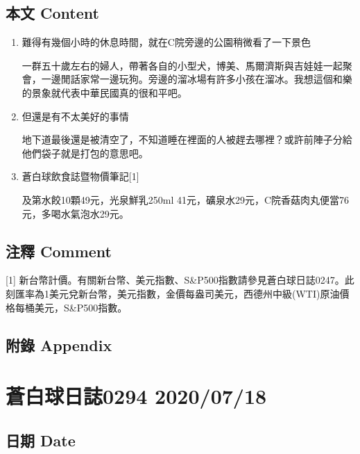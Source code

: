 \documentclass[
]{article}
\begin{document}
\hypertarget{ux672cux6587-content-16}{%
\subsection{本文 Content}\label{ux672cux6587-content-16}}

\begin{enumerate}
\def\labelenumi{\arabic{enumi}.}
\item
  難得有幾個小時的休息時間，就在C院旁邊的公園稍微看了一下景色

  一群五十歲左右的婦人，帶著各自的小型犬，博美、馬爾濟斯與吉娃娃一起聚會，一邊閒話家常一邊玩狗。旁邊的溜冰場有許多小孩在溜冰。我想這個和樂的景象就代表中華民國真的很和平吧。
\item
  但還是有不太美好的事情

  地下道最後還是被清空了，不知道睡在裡面的人被趕去哪裡？或許前陣子分給他們袋子就是打包的意思吧。
\item
  蒼白球飲食誌暨物價筆記{[}1{]}

  及第水餃10顆49元，光泉鮮乳250ml
  41元，礦泉水29元，C院香菇肉丸便當76元，多喝水氣泡水29元。
\end{enumerate}

\hypertarget{ux6ce8ux91cb-comment-16}{%
\subsection{注釋 Comment}\label{ux6ce8ux91cb-comment-16}}

{[}1{]}
新台幣計價。有關新台幣、美元指數、S\&P500指數請參見蒼白球日誌0247。此刻匯率為1美元兌新台幣，美元指數，金價每盎司美元，西德州中級(WTI)原油價格每桶美元，S\&P500指數。

\hypertarget{ux9644ux9304-appendix-16}{%
\subsection{附錄 Appendix}\label{ux9644ux9304-appendix-16}}

\hypertarget{ux84bcux767dux7403ux65e5ux8a8c0294-20200718}{%
\section{蒼白球日誌0294
2020/07/18}\label{ux84bcux767dux7403ux65e5ux8a8c0294-20200718}}

\hypertarget{ux65e5ux671f-date-17}{%
\subsection{日期 Date}\label{ux65e5ux671f-date-17}}
\end{document}
